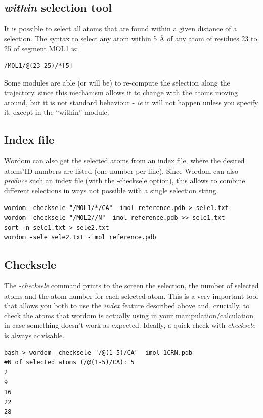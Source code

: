 \documentclass[11pt,twoside,onecolumn,a4paper,openright,notitlepage]{book}[2001/04/21]
\begin{document}
\subsection{\emph{within} selection tool}
It is possible to select all atoms that are found within a given distance of a selection. The syntax to select any atom within 5 \AA{} of any atom of residues 23 to 25 of segment MOL1 is:
\begin{verbatim}
/MOL1/@(23-25)/*[5]
\end{verbatim}
Some modules are able (or will be) to re-compute the selection along the trajectory, since this mechanism allows it to change with the atoms moving around, but it is not standard behaviour - \emph{ie} it will not happen unless you specify it, except in the ``within'' module.

\subsection{Index file}
Wordom can also get the selected atoms from an index file, where the desired atoms'ID numbers are listed (one number per line). Since Wordom can also \emph{produce} such an index file (with the \hyperref[csele]{-checksele} option), this allows to combine different selections in ways not possible with a single selection string.

\begin{verbatim}
wordom -checksele "/MOL1/*/CA" -imol reference.pdb > sele1.txt
wordom -checksele "/MOL2//N" -imol reference.pdb >> sele1.txt
sort -n sele1.txt > sele2.txt
wordom -sele sele2.txt -imol reference.pdb
\end{verbatim}

\subsection{Checksele\label{csele}}
The \emph{-checksele} command prints to the screen the selection, the number of selected atoms and the atom number for each selected atom. This is a very important tool that allows you both to use the \emph{index} feature described above and, crucially, to check the atoms that wordom is actually using in your manipulation/calculation in case something doesn't work as expected. Ideally, a quick check with \emph{checksele} is always advisable.
\begin{verbatim}
bash > wordom -checksele "/@(1-5)/CA" -imol 1CRN.pdb
#N of selected atoms (/@(1-5)/CA): 5
2
9
16
22
28

\end{verbatim}
\end{document}
